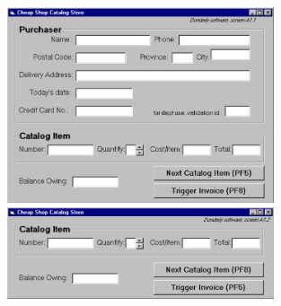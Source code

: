 \documentclass[pdf]{beamer}
\begin{document}
\begin{frame}
\begin{figure}
\vspace*{-32mm}
    \includegraphics[width=0.7\textwidth]{28_Screen1.png} \par
    \vspace{3mm}
   \includegraphics[width=0.7\textwidth]{28_Screen2.png}  
\end{figure}
\frametitle{\textcolor{myBlue}{\textbf{\hspace{5mm}{Cheap Shop}}}} \par
\vspace{10mm}
\textcolor{myBlue}{\footnotesize{{\hspace{15mm}{Screen 1}}}}\par
\vspace{40mm}
\textcolor{myBlue}{\footnotesize{{\hspace{15mm}{Screen 2}}}}
\end{frame}
\end{document}
